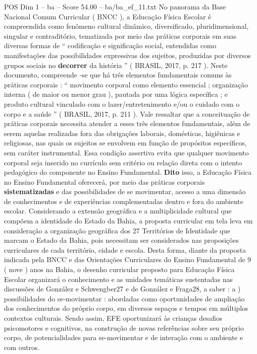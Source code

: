 \begin{textsample}{POS Dim 1 – ba – Score 54.00 – ba/ba\_ef\_11.txt}
No panorama da Base Nacional Comum Curricular ( BNCC ), a Educação Física Escolar é compreendida como fenômeno cultural dinâmico, diversificado, pluridimensional, singular e contraditório, tematizada por meio das práticas corporais em suas diversas formas de “ codificação e significação social, entendidas como manifestações das possibilidades expressivas dos sujeitos, produzidas por diversos grupos sociais no \textbf{decorrer} da história ” ( BRASIL, 2017, p. 217 ).
Neste documento, compreende -se que há três elementos fundamentais comuns às práticas corporais : “ movimento corporal como elemento essencial ; organização interna ( de maior ou menor grau ), pautada por uma lógica específica ; e produto cultural vinculado com o lazer/entretenimento e/ou o cuidado com o corpo e a saúde ” ( BRASIL, 2017, p. 211 ).
Vale ressaltar que a conceituação de práticas corporais necessita atender a esses três elementos fundamentais, além de serem aquelas realizadas fora das obrigações laborais, domésticas, higiênicas e religiosas, nas quais os sujeitos se envolvem em função de propósitos específicos, sem caráter instrumental.
Essa condição assertiva evita que qualquer movimento corporal seja inserido no currículo sem critério ou relação direta com o intento pedagógico do componente no Ensino Fundamental. \textbf{Dito} isso, a Educação Física no Ensino Fundamental oferecerá, por meio das práticas corporais \textbf{sistematizadas} e das possibilidades de se movimentar, acesso a uma dimensão de conhecimentos e de experiências complementadas dentro e fora do ambiente escolar.
Considerando a extensão geográfica e a multiplicidade cultural que compõem a identidade do Estado da Bahia, a proposta curricular em tela leva em consideração a organização geográfica dos 27 Territórios de Identidade que marcam o Estado da Bahia, pois necessitam ser considerados nas proposições curriculares de cada território, cidade e escola.
Desta forma, diante da proposta indicada pela BNCC e das Orientações Curriculares do Ensino Fundamental de 9 ( nove ) anos na Bahia, o desenho curricular proposto para Educação Física Escolar organizará o conhecimento e as unidades temáticas sustentadas nas discussões de González e Schwengber27 e de González e Fraga28, a saber : a ) possibilidades do se-movimentar : abordadas como oportunidades de ampliação dos conhecimentos do próprio corpo, em diversos espaços e tempos em múltiplos contextos culturais.
Sendo assim, EFE oportunizará às crianças desafios psicomotores e cognitivos, na construção de novas referências sobre seu próprio corpo, de potencialidades para se-movimentar e de interação com o ambiente e com outros.

\end{textsample}
